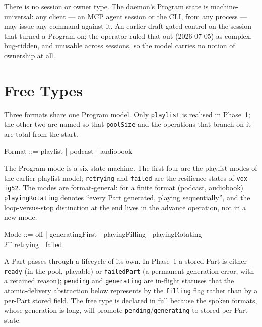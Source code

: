 \documentclass[a4paper,10pt,fleqn]{article}
\begin{document}
There is no session or owner type. The daemon's Program state is
machine-universal: any client --- an MCP agent session or the CLI, from any
process --- may issue any command against it. An earlier draft gated control on
the session that turned a Program on; the operator ruled that out
(2026-07-05) as complex, bug-ridden, and unusable across sessions, so the model
carries no notion of ownership at all.

\begin{zed}
\end{zed}

\section{Free Types}

Three formats share one Program model. Only \texttt{playlist} is realised in
Phase~1; the other two are named so that \texttt{poolSize} and the operations
that branch on it are total from the start.

\begin{zed}
  Format ::= playlist | podcast | audiobook
\end{zed}

The Program mode is a six-state machine. The first four are the playlist modes
of the earlier playlist model; \texttt{retrying} and \texttt{failed} are the
resilience states of \texttt{vox-ig52}. The modes are format-general: for a
finite format (podcast, audiobook) \texttt{playingRotating} denotes ``every
Part generated, playing sequentially'', and the loop-versus-stop distinction at
the end lives in the advance operation, not in a new mode.

\begin{zed}
  Mode ::= off | generatingFirst | playingFilling | playingRotating \\
  \t2 | retrying | failed
\end{zed}

A Part passes through a lifecycle of its own. In Phase~1 a stored Part is either
\texttt{ready} (in the pool, playable) or \texttt{failedPart} (a permanent
generation error, with a retained reason); \texttt{pending} and
\texttt{generating} are in-flight statuses that the atomic-delivery abstraction
below represents by the \texttt{filling} flag rather than by a per-Part stored
field. The free type is declared in full because the spoken formats, whose
generation is long, will promote \texttt{pending}/\texttt{generating} to stored
per-Part state.
\end{document}
